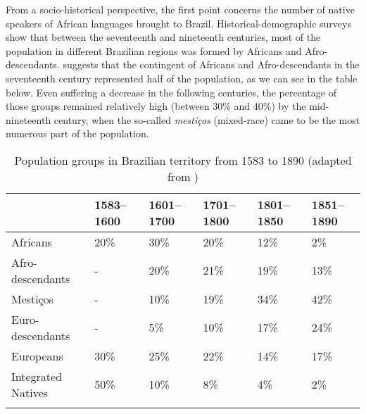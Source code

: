 \documentclass[output=paper]{langsci/langscibook}
\begin{document}
From a socio-historical perspective, the first point concerns the number of
native speakers of African languages brought to Brazil. Historical-demographic
surveys show that between the seventeenth and nineteenth centuries, most of the
population in different Brazilian regions was formed by Africans and
Afro-descendants. \citet[163]{Mussa1991} suggests that the contingent of
Africans and Afro-descendants in the seventeenth century represented half of
the population, as we can see in the table below. Even suffering a decrease in
the following centuries, the percentage of those groups remained relatively
high (between 30\% and 40\%) by the mid-nineteenth century, when the so-called
\emph{mestiços} (mixed-race) came to be the most numerous part of the
population.\largerpage[2.5]

\begin{table}[htpb]
    \centering
    {\small
    \begin{tabular}{llllll}
    \lsptoprule
    & \textbf{1583--1600} & \textbf{1601--1700} & \textbf{1701--1800} & \textbf{1801--1850} & \textbf{1851--1890}\\
    \midrule
    Africans & 20\% & 30\% & 20\% & 12\% & 2\%\\
    Afro-descendants & {}- & 20\% & 21\% & 19\% & 13\%\\
    Mestiços & {}- & 10\% & 19\% & 34\% & 42\%\\
    Euro-descendants & {}- & 5\% & 10\% & 17\% & 24\%\\
    Europeans & 30\% & 25\% & 22\% & 14\% & 17\%\\
    Integrated Natives & 50\% & 10\% & 8\% & 4\% & 2\%\\
    \lspbottomrule
    \end{tabular}
    }
    \caption{Population groups in Brazilian territory from 1583 to 1890
    (adapted from \citealt[163]{Mussa1991})}\label{tab:key:14.1}
\end{table}
\end{document}

